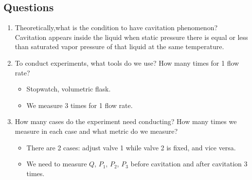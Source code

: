 \subsection{Questions}
\begin{enumerate}
	\item Theoretically,what is the condition to have cavitation phenomenon?\\
	Cavitation appears inside the liquid when static pressure there is  equal or less than saturated vapor pressure of that liquid at the same temperature.
	\item To conduct experiments, what tools do we use? How many times for 1 flow rate?
	\begin{itemize}[label=-]
		\item Stopwatch, volumetric flask.
		\item We measure 3 times for 1 flow rate.
	\end{itemize}
	\item How many cases do the experiment need conducting? How many times we measure in each case and what metric do we measure?
	\begin{itemize}[label=-]
		\item There are 2 cases: adjust valve 1 while valve 2 is fixed, and vice versa.
		\item We need to measure $Q$, $P_1$, $P_2$, $P_3$ before cavitation and after cavitation 3 times.
	\end{itemize}
\end{enumerate}

